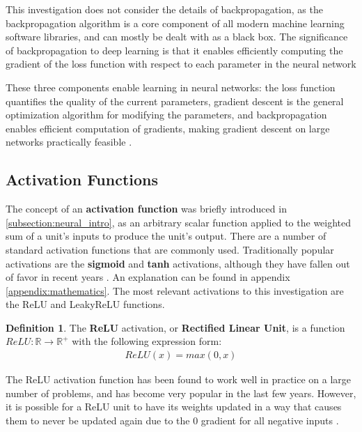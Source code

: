 \documentclass[12pt, titlepage]{report}
\theoremstyle{definition}
\newtheorem{definition}{Definition}
\begin{document}
This investigation does not consider the details of backpropagation, as the backpropagation algorithm is a core component of all modern machine learning software libraries, and can mostly be dealt with as a black box. The significance of backpropagation to deep learning is that it enables efficiently computing the gradient of the loss function with respect to each parameter in the neural network \cite[Backpropagation, Intuitions]{karpathy2017cs231n}

These three components enable learning in neural networks: the loss function quantifies the quality of the current parameters, gradient descent is the general optimization algorithm for modifying the parameters, and backpropagation enables efficient computation of gradients, making gradient descent on large networks practically feasible \cite[Optimization: Stochastic Gradient Descent]{karpathy2017cs231n}.



\subsection{Activation Functions}
The concept of an \textbf{activation function} was briefly introduced in \ref{subsection:neural_intro}, as an arbitrary scalar function applied to the weighted sum of a unit's inputs to produce the unit's output. There are a number of standard activation functions that are commonly used. Traditionally popular activations are the \textbf{sigmoid} and \textbf{tanh} activations, although they have fallen out of favor in recent years \cite[Neural Networks Part 1: Setting up the Architecture]{karpathy2017cs231n}. An explanation can be found in appendix \ref{appendix:mathematics}. The most relevant activations to this investigation are the ReLU and LeakyReLU functions.

\begin{definition}
The \textbf{ReLU} activation, or \textbf{Rectified Linear Unit}, is a function $ReLU: \mathbb{R} \rightarrow \mathbb{R}^+$ with the following expression form:
\begin{gather}\label{eq:relu}
ReLU(x) = max(0, x)
\end{gather}
\end{definition}

The ReLU activation function has been found to work well in practice on a large number of problems, and has become very popular in the last few years. However, it is possible for a ReLU unit to have its weights updated in a way that causes them to never be updated again due to the 0 gradient for all negative inputs \cite[Neural Networks Part 1: Setting up the Architecture]{karpathy2017cs231n}.
\end{document}
